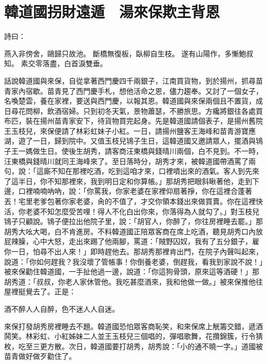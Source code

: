 %

\chapter{韓道國拐財遠遁　湯來保欺主背恩}

詩曰：

燕入非傍舍，鷗歸只故池。
斷橋無復板，臥柳自生枝。
遂有山陽作，多慚鮑叔知。
素交零落盡，白首淚雙垂。

話說韓道國與來保，自從拿著西門慶四千兩銀子，江南買貨物，到於揚州，抓尋苗青家內宿歇。苗青見了西門慶手札，想他活命之恩，儘力趨奉。又討了一個女子，名喚楚雲，養在家裡，要送與西門慶，以報其恩。韓道國與來保兩個且不置貨，成日尋花問柳，飲酒宿婦。只到初冬天氣，景物蕭瑟，不勝旅思。方纔將銀往各處買布匹，裝在揚州苗青家安下，待貨物買完起身。先是韓道國請個表子，是揚州舊院王玉枝兒，來保便請了林彩虹妹子小紅。一日，請揚州鹽客王海峰和苗青游寶應湖，遊了一日，歸到院中。又值玉枝兒鴇子生日，這韓道國又邀請眾人，擺酒與鴇子王一媽做生日。使後生胡秀，請客商汪東橋與錢晴川兩個，白不見到。不一時，汪東橋與錢晴川就同王海峰來了。至日落時分，胡秀才來，被韓道國帶酒罵了兩句，說：「這廝不知在那裡吃酒，吃到這咱才來，口裡噴出來的酒氣。客人到先來了這半日，你不知那裡來，我到明日定和你算帳。」那胡秀把眼斜瞅著他，走到下邊，口裡喃喃吶吶，說：「你罵我，你家老婆在家裡仰扇著掙，你在這裡合蓬著丟！宅里老爹包著你家老婆，肏的不值了，才交你領本錢出來做買賣。你在這裡快活，你老婆不知怎麼受苦哩！得人不化白出你來，你落得為人就勾了。」對玉枝兒鴇子只顧說。鴇子便拉出他院子里，說：「胡官人，你醉了，你往房裡睡去罷。」那胡秀大吆大喝，白不肯進房。不料韓道國正陪眾客商在席上吃酒，聽見胡秀口內放屁辣臊，心中大怒，走出來踢了他兩腳，罵道：「賊野囚奴，我有了五分銀子，雇你一日，怕尋不出人來！」即時趕他去。那胡秀那裡肯出門，在院子內聲叫起來，說道：「你如何趕我？我沒壞了管帳事！你倒養老婆，倒趕我，看我到家說不說！」被來保勸住韓道國，一手扯他過一邊，說道：「你這狗骨頭，原來這等酒硬！」那胡秀道：「叔叔，你老人家休管他。我吃甚麼酒來，我和他做一做。」被來保推他往屋裡挺覺去了。正是：

酒不醉人人自醉，色不迷人人自迷。

來保打發胡秀房裡睡去不題。韓道國恐怕眾客商恥笑，和來保席上觥籌交錯，遞酒鬨笑。林彩虹、小紅姊妹二人並王玉枝兒三個唱的，彈唱歌舞，花攢錦簇，行令猜枚，吃至三更方散。次日，韓道國要打胡秀，胡秀說：「小的通不曉一字。」道國被苗青做好做歹勸住了。

